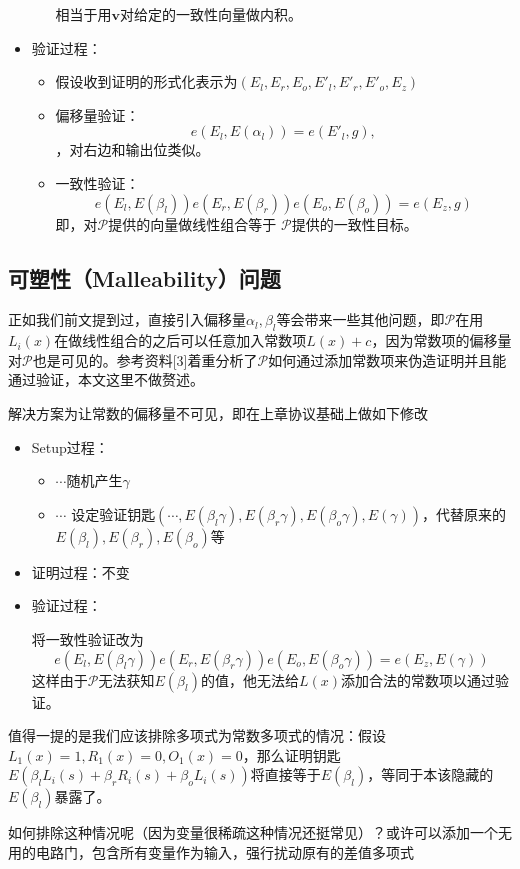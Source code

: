\documentclass[12pt]{article}
\newcommand{\pp}{$\mathcal{P}$}
\begin{document}
\begin{itemize}
\begin{itemize}
     	 相当于用$\bm{v}$对给定的一致性向量做内积。
     	\end{itemize}
     \item 验证过程：
     \begin{itemize}
     	\item 假设收到证明的形式化表示为$(E_l,E_r,E_o,E'_l,E'_r,E'_o,E_z)$
     	\item 偏移量验证：
     	       $$e(E_l,E(\alpha_l))=e(E'_l,g),$$，对右边和输出位类似。
     	 \item 一致性验证：
     	     $$e(E_l,E(\beta_l))e(E_r,E(\beta_r))e(E_o,E(\beta_o))=e(E_z,g)$$
     	     即，对\pp 提供的向量做线性组合等于 \pp 提供的一致性目标。
     \end{itemize}
\end{itemize}
\subsection{可塑性（Malleability）问题}
正如我们前文提到过，直接引入偏移量$\alpha_l,\beta_l$等会带来一些其他问题，即\pp 在用$L_i(x)$在做线性组合的之后可以任意加入常数项$L(x)+c$，因为常数项的偏移量对\pp 也是可见的。参考资料[3]着重分析了\pp 如何通过添加常数项来伪造证明并且能通过验证，本文这里不做赘述。

解决方案为让常数的偏移量不可见，即在上章协议基础上做如下修改
\begin{itemize}
	\item Setup过程：
	\begin{itemize}
		\item  $\cdots$随机产生$\gamma$
		\item $\cdots$ 设定验证钥匙$(\cdots,E(\beta_l\gamma),E(\beta_r\gamma),E(\beta_o\gamma),E(\gamma))$，代替原来的$E(\beta_l),E(\beta_r),E(\beta_o)$等
	\end{itemize}
	\item 证明过程：不变
	\item 验证过程：
	
   将一致性验证改为
  $$e(E_l,E(\beta_l\gamma))e(E_r,E(\beta_r\gamma))e(E_o,E(\beta_o\gamma))=e(E_z,E(\gamma))$$
 这样由于\pp 无法获知$E(\beta_l)$的值，他无法给$L(x)$添加合法的常数项以通过验证。
\end{itemize}

 {\color{red}值得一提的是我们应该排除多项式为常数多项式的情况：假设$L_1(x)=1,R_1(x)=0,O_1(x)=0$，那么证明钥匙$E(\beta_l L_i(s)+\beta_r R_i(s)+\beta_o L_i(s))$将直接等于$E(\beta_l)$，等同于本该隐藏的$E(\beta_l)$暴露了。
 
 如何排除这种情况呢（因为变量很稀疏这种情况还挺常见）？或许可以添加一个无用的电路门，包含所有变量作为输入，强行扰动原有的差值多项式}
\end{document}
